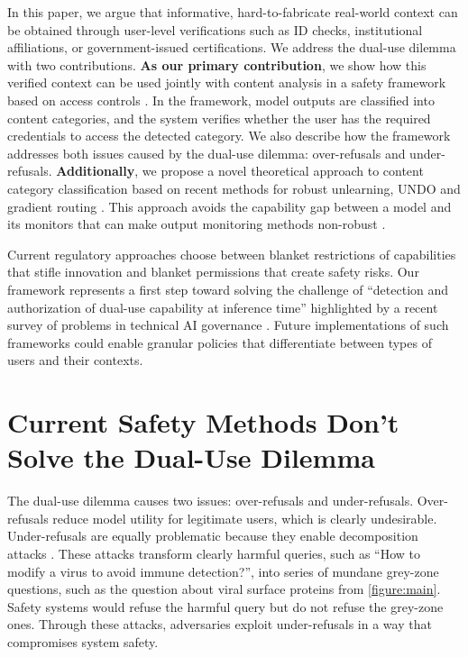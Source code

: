 \documentclass{article}
\theoremstyle{plain}
\theoremstyle{definition}
\theoremstyle{remark}
\begin{document}
In this paper, we argue that informative, hard-to-fabricate real-world context can be obtained through user-level verifications such as ID checks, institutional affiliations, or government-issued certifications.
We address the dual-use dilemma with two contributions.
\textbf{As our primary contribution}, we show how this verified context can be used jointly with content analysis in a safety framework based on access controls \cite{butler1974}.
In the framework, model outputs are classified into content categories, and the system verifies whether the user has the required credentials to access the detected category.
We also describe how the framework addresses both issues caused by the dual-use dilemma: over-refusals and under-refusals.
\textbf{Additionally}, we propose a novel theoretical approach to content category classification based on recent methods for robust unlearning, UNDO \cite{lee2025distillationrobustifiesunlearning} and gradient routing \cite{cloud2024gradientroutingmaskinggradients}.
This approach avoids the capability gap between a model and its monitors that can make output monitoring methods non-robust \cite{jin2024jailbreakinglargelanguagemodels}.

Current regulatory approaches choose between blanket restrictions of capabilities that stifle innovation and blanket permissions that create safety risks.
Our framework represents a first step toward solving the challenge of ``detection and authorization of dual-use capability at inference time'' highlighted by a recent survey of problems in technical AI governance \cite{reuel2025openproblemstechnicalai}.
Future implementations of such frameworks could enable granular policies that differentiate between types of users and their contexts.

\section{Current Safety Methods Don't Solve the Dual-Use Dilemma}
\label{section:current-methods}

The dual-use dilemma causes two issues: over-refusals and under-refusals.
Over-refusals reduce model utility for legitimate users, which is clearly undesirable.
Under-refusals are equally problematic because they enable decomposition attacks \cite{glukhov2023llmcensorshipmachinelearning, glukhov2024breachthousandleaksunsafe}.
These attacks transform clearly harmful queries, such as ``How to modify a virus to avoid immune detection?'', into series of mundane grey-zone questions, such as the question about viral surface proteins from \cref{figure:main}.
Safety systems would refuse the harmful query but do not refuse the grey-zone ones.
Through these attacks, adversaries exploit under-refusals in a way that compromises system safety.
\end{document}

